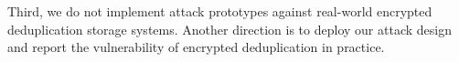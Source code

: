 \documentclass[bachelor]{thesis-uestc}
\begin{document}

Third, we do not implement  attack prototypes against real-world encrypted deduplication storage systems. Another direction is to deploy our attack design and 
report the vulnerability of encrypted deduplication in practice.











\end{document}

